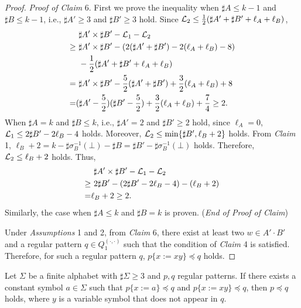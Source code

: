 \begin{proof}
\noindent
\textit{Proof of Claim} 6. 
First we prove the inequality when $\sharp A \leq k - 1$ and $\sharp B \leq k - 1$, i.e., $\sharp A' \geq 3$ and $\sharp B' \geq 3$ hold.
Since ${\cal L}_{2} \leq \frac{1}{2}(\sharp A' + \sharp B' + \ell_{A} + \ell_{B})$,
\begin{align*}
  &\ \sharp A' \times \sharp B' - {\cal L}_{1} - {\cal L}_{2}\\
\geq &\ \sharp A' \times \sharp B' - (2(\sharp A' + \sharp B') - 2(\ell_{A} + \ell_{B}) - 8)\\
  &\ - \frac{1}{2}(\sharp A' + \sharp B' + \ell_{A} + \ell_{B})\\
=    &\ \sharp A' \times \sharp B' - \frac{5}{2}(\sharp A' + \sharp B') + \frac{3}{2}(\ell_{A} + \ell_{B}) + 8\\
=    &(\sharp A' - \frac{5}{2})(\sharp B' - \frac{5}{2}) + \frac{3}{2}(\ell_{A} + \ell_{B}) + \frac{7}{4} \geq 2.
\end{align*}
When $\sharp A = k$ and $\sharp B \leq k$, i.e., $\sharp A' = 2$ and $\sharp B' \geq 2$ hold, since $\ell_{A} = 0$,
${\cal L}_{1} \leq 2\sharp B' - 2\ell_{B} -4$ holds.
Moreover, ${\cal L}_{2} \leq \min\{\sharp B', \ell_{B} + 2\}$ holds.
From \textit{Claim} 1, $\ell_B + 2 = k - \sharp\sigma^{-1}_{B}(\bot) - \sharp B = \sharp B' - \sharp\sigma^{-1}_{B}(\bot)$ holds. Therefore, ${\cal L}_{2} \leq \ell_{B} + 2$ holds.
Thus,
\begin{align*}
  &\ \sharp A' \times \sharp B' - {\cal L}_{1} - {\cal L}_{2}\\
\geq &\ 2\sharp B' - (2\sharp B' - 2\ell_{B} -4) - (\ell_{B} + 2)\\
= & \ell_B + 2 \geq 2.
\end{align*}
Similarly, the case when $\sharp A \leq k$ and $\sharp B = k$ is proven.
(\textit{End of Proof of Claim})

\smallskip

Under \textit{Assumptions} 1 and 2, from \textit{Claim} 6, there exist at least two $w\in A'\cdot B'$ and a regular pattern $q \in Q_{1}^{(\cdot,\cdot)}$ such that the condition of \textit{Claim} 4 is satisfied. 
Therefore, for such a regular pattern $q$, $p \{x := xy\} \preceq q$ holds.
\end{proof}

\begin{lem}\label{補題15}
Let $\Sigma$ be a finite alphabet with $\sharp \Sigma \ge 3$ and $p,q$ regular patterns.
If there exists a constant symbol $a \in \Sigma$ such that $p \{ x := a \} \preceq q$ and $p \{ x := xy \} \preceq q$, then $p \preceq q$ holds, where $y$ is a variable symbol that does not appear in $q$.
\end{lem}

